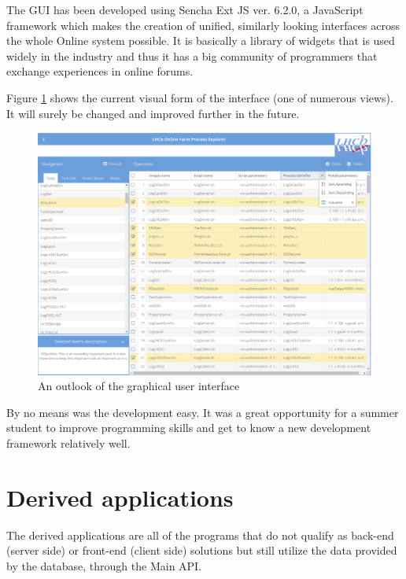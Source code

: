 \documentclass{customization}
\begin{document}
\noindent
The GUI has been developed using Sencha Ext JS ver. 6.2.0, a JavaScript framework which makes the creation of unified, similarly looking interfaces across the whole Online system possible. It is basically a library of widgets that is used widely in the industry and thus it has a big community of programmers that exchange experiences in online forums.
\newline

\noindent
Figure \ref{fig:gui} shows the current visual form of the interface (one of numerous views). It will surely be changed and improved further in the future.

\begin{figure}[H]
\centering
    \includegraphics[scale=0.35]{images/gui.png}
    \caption{An outlook of the graphical user interface}
    \label{fig:gui}
\end{figure}

\noindent
By no means was the development easy. It was a great opportunity for a summer student to improve programming skills and get to know a new development framework relatively well.


\section{Derived applications}
\hspace{0.6cm}

The derived applications are all of the programs that do not qualify as back-end (server side) or front-end (client side) solutions but still utilize the data provided by the database, through the Main API.
\end{document}
